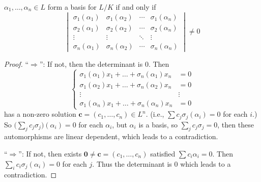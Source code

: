 \begin{lemma} \label{lemma:basis-iff-det-neq-0}
  $\alpha_1, \dots, \alpha_n \in L$ form a basis for $L/K$ if and only if
  \[
    \begin{vmatrix}
      \sigma_1(\alpha_1) & \sigma_1(\alpha_2) & \cdots & \sigma_1(\alpha_n) \\
      \sigma_2(\alpha_1) & \sigma_2(\alpha_2) & \cdots & \sigma_2(\alpha_n) \\
      \vdots & \vdots & \ddots & \vdots \\
      \sigma_n(\alpha_1) & \sigma_n(\alpha_2) & \cdots & \sigma_n(\alpha_n)
    \end{vmatrix} \neq 0
  \]

  \begin{proof}
    ``$\Rightarrow$'': If not, then the determinant is $0$. Then
    \[ \left\{
          \begin{array}{cr}
          \sigma_1(\alpha_1) x_1 + \dots + \sigma_n(\alpha_1) x_n &= 0 \\
          \sigma_1(\alpha_2) x_1 + \dots + \sigma_n(\alpha_2) x_n &= 0 \\
          \vdots & \vdots \\
          \sigma_1(\alpha_n) x_1 + \dots + \sigma_n(\alpha_n) x_n &= 0
        \end{array}
      \right.
    \]
    has a non-zero solution $\bm{c} = (c_1, \dots, c_n) \in L^n$. (i.e., $\sum c_j \sigma_j(\alpha_i) = 0$
    for each $i$.) So $\big( \sum_{j} c_j \sigma_j \big)(\alpha_i) = 0$ for each $\alpha_i$,
    but $\alpha_i$ is a basis, so $\sum_{j} c_j \sigma_j = 0$, then these automorphisms
    are linear dependent, which leads to a contradiction.

    ``$\Rightarrow$'': If not, then exists $\bm{0} \neq \bm{c} = (c_1, \dots, c_n)$
    satisfied $\sum c_i \alpha_i = 0$. Then $\sum_i c_i \sigma_j(\alpha_i) = 0$
    for each $j$. Thus the determinant is $0$ which leads to a contradiction.
  \end{proof}
\end{lemma}

